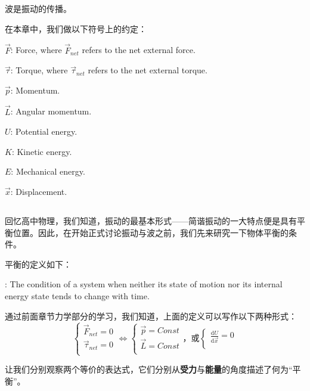 \newcommand{\D}[3][]{\dfrac{\dif^{#1} #2}{\dif#3^{#1}}}
\newcommand{\Par}[3][]{\dfrac{\partial^{#1} #2}{\partial#3^{#1}}}
\chapter[振动与波]{}
波是振动的传播。\par
在本章中，我们做以下符号上的约定：
\begin{Itemize}
    \item $\vec{F}$: Force, where $\vec{F}_{net}$ refers to the net external force.
    \item $\vec{\tau}$: Torque, where $\vec{\tau}_{net}$ refers to the net external torque.
    \item $\vec{p}$: Momentum.
    \item $\vec{L}$: Angular momentum.
    \item $U$: Potential energy.
    \item $K$: Kinetic energy.
    \item $E$: Mechanical energy.
    \item $\vec{x}$: Displacement.
\end{Itemize}
\section[平衡]{}
回忆高中物理，我们知道，振动的最基本形式——简谐振动的一大特点便是具有平衡位置。因此，在开始正式讨论振动与波之前，我们先来研究一下物体平衡的条件。

平衡的定义如下：
\begin{Itemize}
    \item {}: The condition of a system when neither its state of motion nor its internal energy state tends to change with time.
\end{Itemize}
通过前面章节力学部分的学习，我们知道，上面的定义可以写作以下两种形式：
$$
    \left\{\begin{aligned}
        \vec{F}_{net}=0    \\
        \vec{\tau}_{net}=0 \\
    \end{aligned}
    \right.
    \Leftrightarrow
    \left\{\begin{aligned}
        \vec{p}=Const \\
        \vec{L}=Const \\
    \end{aligned}
    \right.
    \text{，或}
    \left\{\begin{aligned}
        \frac{\mathrm{d}U}{\mathrm{d}\vec{x}}=0 \\
    \end{aligned}
    \right.
$$\par
让我们分别观察两个等价的表达式，它们分别从\textbf{受力}与\textbf{能量}的角度描述了何为“平衡”。

